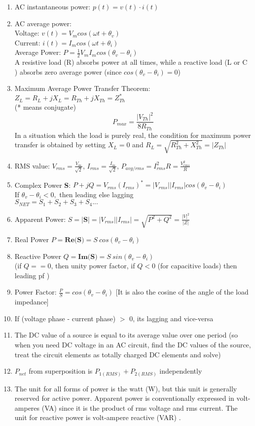 \documentclass[10pt]{article}
\begin{document}
\begin{enumerate}
\item AC instantaneous power: $p(t) = v(t)\cdot i(t)$
\item AC average power: \\Voltage: $v(t) = V_m cos({\omega} t + {\theta}_v)$\\Current: $i(t) = I_m cos({\omega} t + {\theta}_i)$\\Average Power: $P = \frac{1}{2}V_m I_m cos({\theta}_v - {\theta}_i)$\\
A resistive load (R) absorbs power at all times, while a reactive load (L or C ) absorbs zero average power (since $cos({\theta}_v - {\theta}_i) = 0$)
\item Maximum Average Power Transfer Theorem: $Z_L = R_L + jX_L = R_{Th} + jX_{Th} = Z^*_{Th}$ \\(* means conjugate) 
$$P_{max} = \frac{|V_{Th}|^2}{8R_{Th}}$$ In a situation which the load is purely real, the condition for maximum power transfer is obtained by setting $X_L = 0$ and $R_L = \sqrt{R_{Th}^2 + X_{Th}^2} = |Z_{Th}|$
\item RMS value: $V_{rms} = \frac{V_{m}}{\sqrt{2}}$, $I_{rms} = \frac{I_{m}}{\sqrt{2}}$, $P_{avg/rms} = I_{rms}^2R = \frac{V_{rms}^2}{R}$
\item Complex Power \textbf{S}: $P+jQ = V_{rms} (I_{rms})^* = |V_{rms}| |I_{rms}| cos({\theta}_v - {\theta}_i)$\\
If ${\theta}_v - {\theta}_i < 0,$ then leading else lagging\\
$S_{NET} = S_1 + S_2 + S_3 + S_4 ...$
\item Apparent Power: $S = |\textbf{S}| = |V_{rms}| |I_{rms}| = \sqrt{P^2 + Q^2} = \frac{|V|^2}{|Z|}$
\item Real Power $P = \textbf{Re(S)} = S\ cos({\theta}_v - {\theta}_i)$
\item Reactive Power $Q = \textbf{Im(S)} = S\ sin({\theta}_v - {\theta}_i)$ \\(if $Q == 0$, then unity power factor, if $Q < 0$ (for capacitive loads) then leading pf )
\item Power Factor: $\frac{P}{S} = cos({\theta}_v - {\theta}_i)$ [It is also the cosine of the angle of the load impedance]
\item If (voltage phase - current phase) $>$ 0, its lagging and vice-versa
\item The DC value of a source is equal to its average value over one period (so when you need DC voltage in an AC circuit, find the DC values of the source, treat the circuit elements as totally charged DC elements and solve)
\item $P_{net}$ from superposition is $P_{1(RMS)} + P_{2(RMS)}$ independently
\item The unit for all forms of power is the watt (W), but this unit is generally reserved for active power. Apparent power is conventionally expressed in volt-amperes (VA) since it is the product of rms voltage and rms current. The unit for reactive power is volt-ampere reactive (VAR) .

\end{enumerate}



\pagebreak
\setlength{\voffset}{0.15in}
\end{document}
